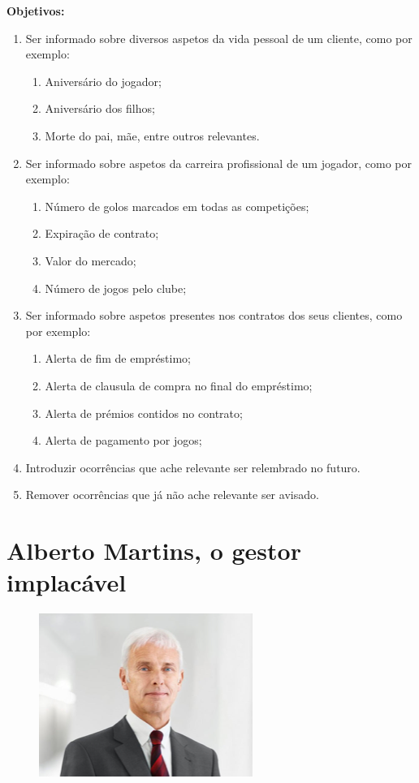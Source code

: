 \textbf{Objetivos:}
\begin{enumerate}
    \item Ser informado sobre diversos aspetos da vida pessoal de um cliente, como por exemplo:
    \begin{enumerate}
        \item Aniversário do jogador;
        \item Aniversário dos filhos;
        \item Morte do pai, mãe, entre outros relevantes.
    \end{enumerate}
    \item Ser informado sobre aspetos da carreira profissional de um jogador, como por exemplo:
    \begin{enumerate}
        \item Número de golos marcados em todas as competições;
        \item Expiração de contrato;
        \item Valor do mercado;
        \item Número de jogos pelo clube;
    \end{enumerate}
    \item Ser informado sobre aspetos presentes nos contratos dos seus clientes, como por exemplo:
    \begin{enumerate}
        \item Alerta de fim de empréstimo;
        \item Alerta de clausula de compra no final do empréstimo;
        \item Alerta de prémios contidos no contrato;
        \item Alerta de pagamento por jogos;
    \end{enumerate}
    \item Introduzir ocorrências que ache relevante ser relembrado no futuro.
    \item Remover ocorrências que já não ache relevante ser avisado.
\end{enumerate}

\newpage

\section{Alberto Martins, o gestor implacável}

\begin{figure}[H]
    \includegraphics[scale=1]{img/Picture1.png}
\end{figure}

